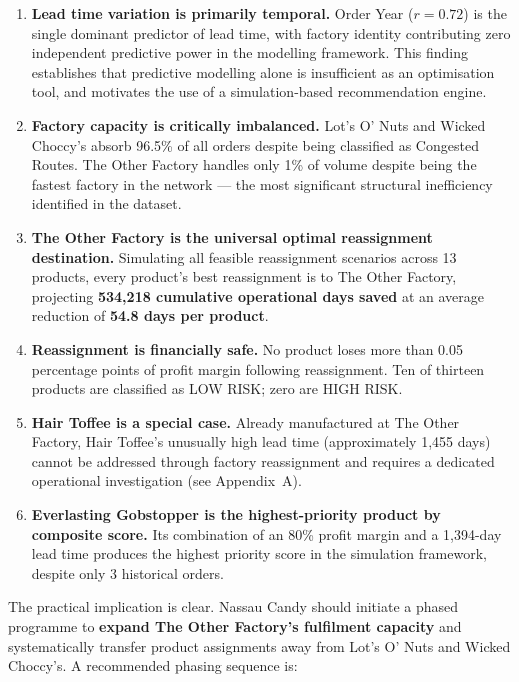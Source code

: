 \documentclass[12pt, a4paper]{article}
\begin{document}
\begin{enumerate}[leftmargin=*, label=\arabic*.]
    \item \textbf{Lead time variation is primarily temporal.}
          Order Year ($r = 0.72$) is the single dominant
          predictor of lead time, with factory identity
          contributing zero independent predictive power in
          the modelling framework. This finding establishes
          that predictive modelling alone is insufficient as
          an optimisation tool, and motivates the use of
          a simulation-based recommendation engine.
    \item \textbf{Factory capacity is critically imbalanced.}
          Lot's O' Nuts and Wicked Choccy's absorb 96.5\%
          of all orders despite being classified as Congested
          Routes. The Other Factory handles only 1\% of
          volume despite being the fastest factory in the
          network --- the most significant structural
          inefficiency identified in the dataset.
    \item \textbf{The Other Factory is the universal optimal
          reassignment destination.} Simulating all feasible
          reassignment scenarios across 13 products, every
          product's best reassignment is to The Other Factory,
          projecting \textbf{534,218 cumulative operational
          days saved} at an average reduction of
          \textbf{54.8 days per product}.
    \item \textbf{Reassignment is financially safe.} No
          product loses more than 0.05 percentage points of
          profit margin following reassignment. Ten of
          thirteen products are classified as LOW RISK;
          zero are HIGH RISK.
    \item \textbf{Hair Toffee is a special case.} Already
          manufactured at The Other Factory, Hair Toffee's
          unusually high lead time (approximately 1,455 days)
          cannot be addressed through factory reassignment
          and requires a dedicated operational investigation
          (see Appendix~A).
    \item \textbf{Everlasting Gobstopper is the
          highest-priority product by composite score.} Its
          combination of an 80\% profit margin and a
          1,394-day lead time produces the highest priority
          score in the simulation framework, despite only
          3 historical orders.
\end{enumerate}

The practical implication is clear. Nassau Candy should
initiate a phased programme to \textbf{expand The Other
Factory's fulfilment capacity} and systematically transfer
product assignments away from Lot's O' Nuts and Wicked
Choccy's. A recommended phasing sequence is:
\end{document}
